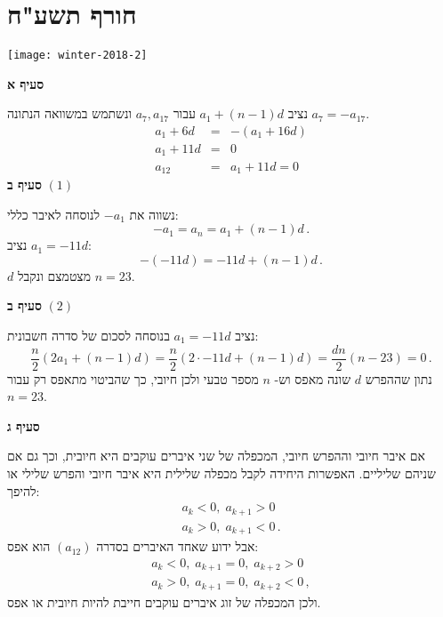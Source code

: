 \np
\section{חורף תשע"ח}

\begin{center}
\texttt{[image: winter-2018-2]}
\end{center}

\vspace{-3ex}

\textbf{סעיף א}

נציב 
$a_1+(n-1)d$
עבור 
$a_7,a_{17}$
ונשתמש במשוואה הנתונה
$a_7=-a_{17}$.
\begin{eqnarray*}
a_1+6d &=& -(a_1+16d)\\
a_1+11d &=& 0\\
a_{12} &=&a_1+11d = 0
\end{eqnarray*}
\textbf{סעיף ב}
$(1)$

נשווה את
$-a_1$
לנוסחה לאיבר כללי:
\[
-a_1 = a_n = a_1 + (n-1)d\,.
\]
נציב
$a_1=-11d$:
\[
-(-11d) = -11d + (n-1)d\,.
\]
$d$
מצטמצם ונקבל
$n=23$.

\textbf{סעיף ב}
$(2)$

נציב
$a_1=-11d$
 בנוסחה לסכום של סדרה חשבונית:
\[
\frac{n}{2}(2a_1+(n-1)d) = \frac{n}{2}(2\cdot -11d+(n-1)d) =\frac{dn}{2} (n-23)=0\,.
\]
נתון שההפרש 
$d$
שונה מאפס וש-%
$n$
מספר טבעי ולכן חיובי, כך שהביטוי מתאפס רק עבור
$n=23$.

\textbf{סעיף ג}

אם איבר חיובי וההפרש חיובי, המכפלה של שני איברים עוקבים היא חיובית, וכך גם אם שניהם שליליים. האפשרות היחידה לקבל מכפלה שלילית היא איבר חיובי והפרש שלילי או להיפך:
\[
\begin{array}{l}
a_k<0,\; a_{k+1}>0\\
a_k>0,\; a_{k+1}<0\,.
\end{array}
\]
אבל ידוע שאחד האיברים בסדרה 
$(a_{12})$
הוא אפס:
\[
\begin{array}{l}
a_k<0,\; a_{k+1}=0,\; a_{k+2}>0\\
a_k>0,\; a_{k+1}=0,\; a_{k+2}<0\,,
\end{array}
\]
ולכן המכפלה של זוג איברים עוקבים חייבת להיות חיובית או אפס.

